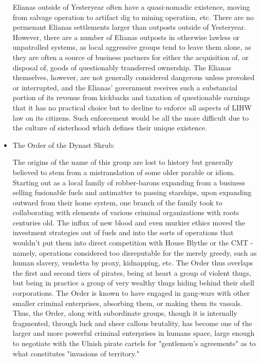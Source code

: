 \begin{itemize}
Elianas outside of Yesteryear often have a quasi-nomadic existence,
moving from salvage operation to artifact dig to mining operation,
etc. There are no permenant Elianas settlements larger than outposts
outside of Yesteryear. However, there are a number of Elianas outposts
in otherwise lawless or unpatrolled systems, as local aggressive
groups tend to leave them alone, as they are often a source of
business partners for either the acquisition of, or disposal of, goods
of questionably transferred ownership. The Elianas themselves,
however, are not generally considered dangerous unless provoked or
interrupted, and the Elianas' government receives such a substancial
portion of its revenue from kickbacks and taxation of questionable
earnings that it has no practical choice but to decline to enforce all
aspects of LIHW law on its citizens. Such enforcement would be all the
more difficult due to the culture of sisterhood which defines their
unique existence.

\item The Order of the Dynast Shrub: 

The origins of the name of this group are lost to history but
generally believed to stem from a mistranslation of some older parable
or idiom. Starting out as a local family of robber-barons expanding
from a business selling fusionable fuels and antimatter to passing
starships, upon expanding outward from their home system, one branch
of the family took to collaborating with elements of various criminal
organizations with roots centuries old. The influx of new blood and
even murkier ethics moved the investment strategies out of fuels and
into the sorts of operations that wouldn't put them into direct
competition with House Blythe or the CMT - namely, operations
considered too disreputable for the merely greedy, such as human
slavery, vendetta by proxy, kidnapping, etc. The Order thus overlaps
the first and second tiers of pirates, being at heart a group of
violent thugs, but being in practice a group of very wealthy thugs
hiding behind their shell corporations. The Order is known to have
engaged in gang-wars with other smaller criminal enterprises,
absorbing them, or making them its vassals. Thus, the Order, along
with subordinate groups, though it is internally fragmented, through
luck and sheer callous brutality, has become one of the larger and
more powerful criminal enterprises in humans space, large enough to
negotiate with the Ulnish pirate cartels for "gentlemen's agreements"
as to what constitutes "invasions of territory."


\end{itemize}
